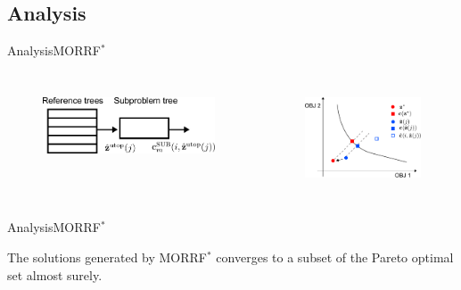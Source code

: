 \subsection{Analysis}

\begin{frame}{Analysis}{MORRF$^{*}$}
\begin{columns}
	\begin{figure}
		\centering
		\includegraphics[width=\linewidth]{figure/cascade}
		\label{fig:morrt:cascade}
	\end{figure}
	\begin{figure}
		\centering
		\includegraphics[width=\linewidth]{figure/conv}
		\label{fig:morrt:conv}
	\end{figure}
\end{columns}
\end{frame}

\begin{frame}{Analysis}{MORRF$^{*}$}

\begin{thm}
The solutions generated by MORRF$^{*}$ converges to a subset of the Pareto optimal set
almost surely.
\end{thm}

\end{frame}